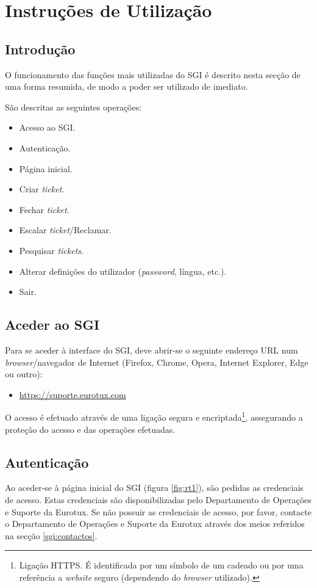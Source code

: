 \chapter{Instruções de Utilização}
\section{Introdução}
O funcionamento das funções mais utilizadas do SGI é descrito nesta secção de uma forma resumida, de modo a poder ser utilizado de imediato.

São descritas as seguintes operações:
\begin{itemize}
\item Acesso ao SGI.
\item Autenticação. 
\item Página inicial.
\item Criar \textit{ticket}.
\item Fechar \textit{ticket}.
\item Escalar \textit{ticket}/Reclamar.
\item Pesquisar \textit{tickets}.
\item Alterar definições do utilizador (\textit{password}, língua, etc.).
\item Sair.
\end{itemize}

\section{Aceder ao SGI}
Para se aceder à interface do SGI, deve abrir-se o seguinte endereço URL num \textit{browser}/navegador de Internet (Firefox, Chrome, Opera, Internet Explorer, Edge ou outro):

\begin{itemize}
\item \url{https://suporte.eurotux.com}
\end{itemize}

O acesso é efetuado através de uma ligação segura e encriptada\footnote{Ligação HTTPS. É identificada por um símbolo de um cadeado ou por uma referência a \textit{website} seguro (dependendo do \textit{browser} utilizado).}, assegurando a proteção do acesso e das operações efetuadas.

\section{Autenticação}
Ao aceder-se à página inicial do SGI (figura \ref{fig:rt1}), são pedidas as credenciais de acesso.
Estas credenciais são disponibilizadas pelo Departamento de Operações e Suporte da Eurotux.
Se não possuir as credenciais de acesso, por favor, contacte o Departamento de Operações e Suporte da Eurotux através dos meios referidos na secção \ref{sgi:contactos}.

